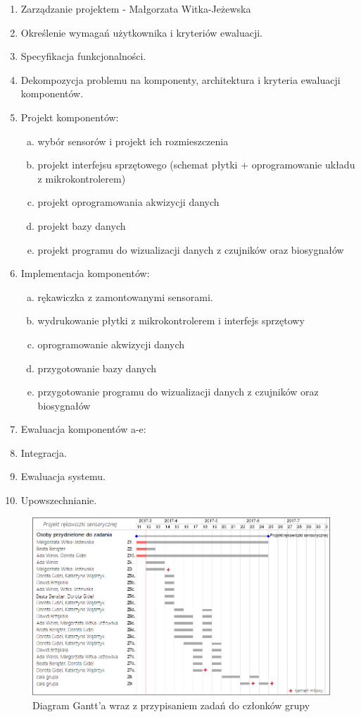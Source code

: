 \documentclass{article}
\begin{document}
\begin{enumerate}
    \item Zarządzanie projektem - Małgorzata Witka-Jeżewska
    \item Określenie wymagań użytkownika i kryteriów ewaluacji.
    \item Specyfikacja funkcjonalności.
    \item Dekompozycja problemu na komponenty, architektura i kryteria ewaluacji komponentów.
    \item Projekt komponentów:
    \begin{enumerate}[a)]
        \item wybór sensorów i projekt ich rozmieszczenia
        \item projekt interfejsu sprzętowego (schemat płytki + oprogramowanie układu z mikrokontrolerem)
        \item projekt oprogramowania akwizycji danych
        \item projekt bazy danych
        \item projekt programu do wizualizacji danych z czujników oraz biosygnałów
    \end{enumerate}
        \item Implementacja komponentów:
    \begin{enumerate}[a)]
        \item rękawiczka z zamontowanymi sensorami.
        \item wydrukowanie płytki z mikrokontrolerem i interfejs sprzętowy
        \item oprogramowanie akwizycji danych
        \item przygotowanie bazy danych
        \item przygotowanie programu do wizualizacji danych z czujników oraz biosygnałów
    \end{enumerate}
            \item Ewaluacja komponentów a-e:
    \item Integracja.
    \item Ewaluacja systemu.
    \item Upowszechnianie.
\end{enumerate}

\begin{figure}[h!]
\centering
\includegraphics[scale=0.8]{projekt-rekawiczki-sensorycznej-gantt.png}
\caption{Diagram Gantt'a wraz z przypisaniem zadań do członków grupy}
\label{fig:projekt-rekawiczki-sensorycznej-gantt}
\end{figure}
\end{document}
